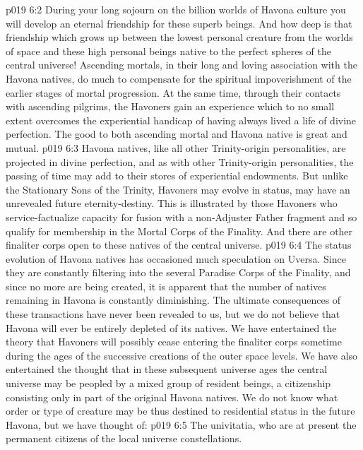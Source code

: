 \vs p019 6:2 During your long sojourn on the billion worlds of Havona culture you will develop an eternal friendship for these superb beings. And how deep is that friendship which grows up between the lowest personal creature from the worlds of space and these high personal beings native to the perfect spheres of the central universe! Ascending mortals, in their long and loving association with the Havona natives, do much to compensate for the spiritual impoverishment of the earlier stages of mortal progression. At the same time, through their contacts with ascending pilgrims, the Havoners gain an experience which to no small extent overcomes the experiential handicap of having always lived a life of divine perfection. The good to both ascending mortal and Havona native is great and mutual.
\pc \vs p019 6:3 Havona natives, like all other Trinity\hyp{}origin personalities, are projected in divine perfection, and as with other Trinity\hyp{}origin personalities, the passing of time may add to their stores of experiential endowments. But unlike the Stationary Sons of the Trinity, Havoners may evolve in status, may have an unrevealed future eternity\hyp{}destiny. This is illustrated by those Havoners who service\hyp{}factualize capacity for fusion with a non\hyp{}Adjuster Father fragment and so qualify for membership in the Mortal Corps of the Finality. And there are other finaliter corps open to these natives of the central universe.\plusone
\pc \vs p019 6:4 The status evolution of Havona natives has occasioned much speculation on Uversa. Since they are constantly filtering into the several Paradise Corps of the Finality, and since no more are being created, it is apparent that the number of natives remaining in Havona is constantly diminishing. The ultimate consequences of these transactions have never been revealed to us, but we do not believe that Havona will ever be entirely depleted of its natives. We have entertained the theory that Havoners will possibly cease entering the finaliter corps sometime during the ages of the successive creations of the outer space levels. We have also entertained the thought that in these subsequent universe ages the central universe may be peopled by a mixed group of resident beings, a citizenship consisting only in part of the original Havona natives. We do not know what order or type of creature may be thus destined to residential status in the future Havona, but we have thought of:
\pc \vs p019 6:5 \bibnobreakspace The univitatia, who are at present the permanent citizens of the local universe constellations.
